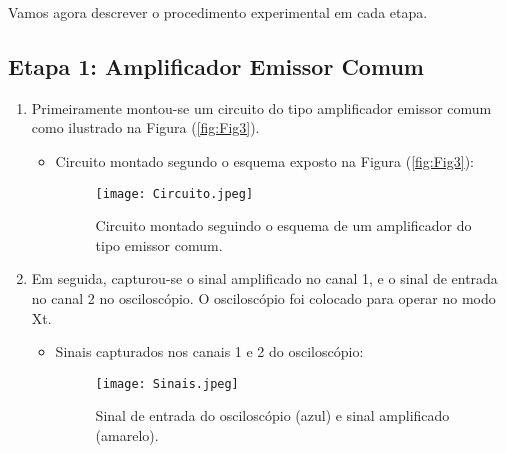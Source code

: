 \documentclass[letterpaper, 12pt]{article}
\begin{document}
Vamos agora descrever o procedimento experimental em cada etapa.

\subsection{Etapa 1: Amplificador Emissor Comum}\label{Etapa 1}
\begin{enumerate}
    \item Primeiramente montou-se um circuito do tipo amplificador emissor comum como ilustrado na Figura (\ref{fig:Fig3}).
    \begin{itemize}
        \item Circuito montado segundo o esquema exposto na Figura (\ref{fig:Fig3}):
        \begin{figure}[h!]
            \centering
            \texttt{[image: Circuito.jpeg]}
            \caption{Circuito montado seguindo o esquema de um amplificador do tipo emissor comum.}
            \label{fig: Sinais 1 e 2}
        \end{figure}
    \end{itemize}
    
    \item Em seguida, capturou-se o sinal amplificado no canal 1, e o sinal de entrada no canal 2 no osciloscópio. O osciloscópio foi colocado para operar no modo Xt.
    \begin{itemize}
        \item Sinais capturados nos canais 1 e 2 do osciloscópio:
        \begin{figure}[h!]
            \centering
            \texttt{[image: Sinais.jpeg]}
            \caption{Sinal de entrada do osciloscópio (azul) e sinal amplificado (amarelo).}
            \label{fig: Sinais 1 e 2}
        \end{figure}
    \end{itemize}
\end{enumerate}
\end{document}
